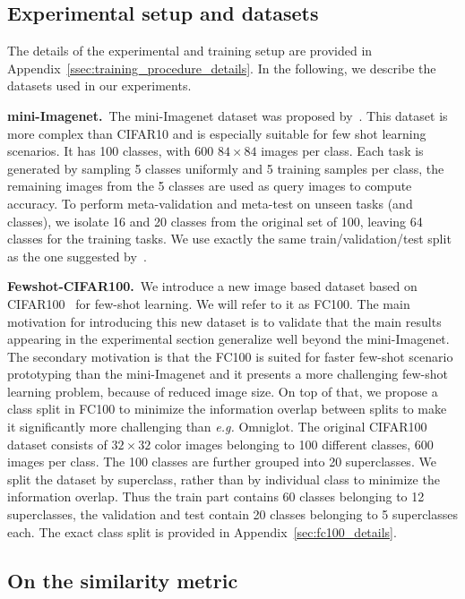 \documentclass{article}
\begin{document}
\subsection{Experimental setup and datasets}\label{ssec:datasets}

The details of the experimental and training setup are provided in Appendix~\ref{ssec:training_procedure_details}. In the following, we describe the datasets used in our experiments.

\textbf{mini-Imagenet.}~The mini-Imagenet dataset was proposed by~\citet{vinyals2016matching}. This dataset is more complex than CIFAR10 and is especially suitable for few shot learning scenarios. It has 100 classes, with 600 $84 \times 84$ images per class. Each task is generated by sampling 5 classes uniformly and 5 training samples per class, the remaining images from the 5 classes are used as query images to compute accuracy. To perform meta-validation and meta-test on unseen tasks (and classes), we isolate 16 and 20 classes from the original set of 100, leaving 64 classes for the training tasks. We use exactly the same train/validation/test split as the one suggested by~\citet{ravi2016optimization}. 

\textbf{Fewshot-CIFAR100.}~We introduce a new image based dataset based on CIFAR100~\citep{Krizhevsky2009learning} for few-shot learning. We will refer to it as FC100. The main motivation for introducing this new dataset is to validate that the main results appearing in the experimental section generalize well beyond the mini-Imagenet. The secondary motivation is that the FC100 is suited for faster few-shot scenario prototyping than the mini-Imagenet and it presents a more challenging few-shot learning problem, because of reduced image size. On top of that, we propose a class split in FC100 to minimize the information overlap between splits to make it significantly more challenging than \emph{e.g.} Omniglot. The original CIFAR100 dataset consists of $32 \times 32$ color images belonging to 100 different classes, 600 images per class. The 100 classes are further grouped into 20 superclasses. We split the dataset by superclass, rather than by individual class to minimize the information overlap. Thus the train part contains 60 classes belonging to 12 superclasses, the validation and test contain 20 classes belonging to 5 superclasses each. The exact class split is provided in Appendix~\ref{sec:fc100_details}.

\subsection{On the similarity metric}\label{ssec:cosine_distance}
\end{document}
